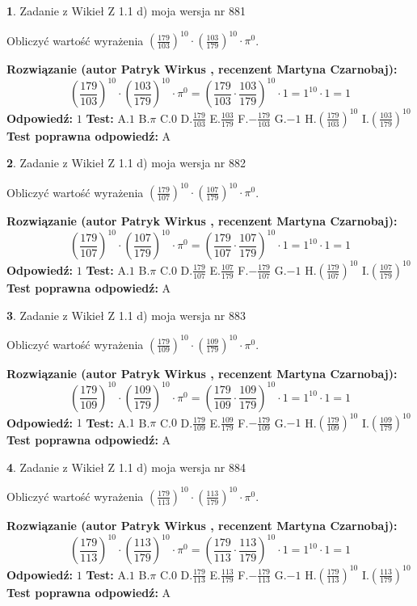 \documentclass[12pt, a4paper]{article}
\theoremstyle{definition} %
\newtheorem{zad}{}
\newcommand{\zadStart}[1]{\begin{zad}#1\newline}
\newcommand{\zadStop}{\end{zad}}
\newcommand{\rozwStart}[2]{\noindent \textbf{Rozwiązanie (autor #1 , recenzent #2): }\newline}
\newcommand{\rozwStop}{\newline}
\newcommand{\odpStart}{\noindent \textbf{Odpowiedź:}\newline}
\newcommand{\odpStop}{\newline}
\newcommand{\testStart}{\noindent \textbf{Test:}\newline}
\newcommand{\testStop}{\newline}
\newcommand{\kluczStart}{\noindent \textbf{Test poprawna odpowiedź:}\newline}
\newcommand{\kluczStop}{\newline}
\begin{document}
\zadStart{Zadanie z Wikieł Z 1.1 d) moja wersja nr 881}

Obliczyć wartość wyrażenia $(\frac{179}{103})^{10} \cdot (\frac{103}{179})^{10} \cdot \pi^{0}$.
\zadStop
\rozwStart{Patryk Wirkus}{Martyna Czarnobaj}
$$(\frac{179}{103})^{10} \cdot (\frac{103}{179})^{10} \cdot \pi^{0} = (\frac{179}{103} \cdot \frac{103}{179})^{10} \cdot 1 = 1^{10} \cdot 1 = 1$$
\rozwStop
\odpStart
$1$
\odpStop
\testStart
A.$1$ B.$\pi$ C.$0$ D.$\frac{179}{103}$ E.$\frac{103}{179}$
F.$-\frac{179}{103}$ G.$-1$
H.$(\frac{179}{103})^{10}$
I.$(\frac{103}{179})^{10}$
\testStop
\kluczStart
A
\kluczStop



\zadStart{Zadanie z Wikieł Z 1.1 d) moja wersja nr 882}

Obliczyć wartość wyrażenia $(\frac{179}{107})^{10} \cdot (\frac{107}{179})^{10} \cdot \pi^{0}$.
\zadStop
\rozwStart{Patryk Wirkus}{Martyna Czarnobaj}
$$(\frac{179}{107})^{10} \cdot (\frac{107}{179})^{10} \cdot \pi^{0} = (\frac{179}{107} \cdot \frac{107}{179})^{10} \cdot 1 = 1^{10} \cdot 1 = 1$$
\rozwStop
\odpStart
$1$
\odpStop
\testStart
A.$1$ B.$\pi$ C.$0$ D.$\frac{179}{107}$ E.$\frac{107}{179}$
F.$-\frac{179}{107}$ G.$-1$
H.$(\frac{179}{107})^{10}$
I.$(\frac{107}{179})^{10}$
\testStop
\kluczStart
A
\kluczStop



\zadStart{Zadanie z Wikieł Z 1.1 d) moja wersja nr 883}

Obliczyć wartość wyrażenia $(\frac{179}{109})^{10} \cdot (\frac{109}{179})^{10} \cdot \pi^{0}$.
\zadStop
\rozwStart{Patryk Wirkus}{Martyna Czarnobaj}
$$(\frac{179}{109})^{10} \cdot (\frac{109}{179})^{10} \cdot \pi^{0} = (\frac{179}{109} \cdot \frac{109}{179})^{10} \cdot 1 = 1^{10} \cdot 1 = 1$$
\rozwStop
\odpStart
$1$
\odpStop
\testStart
A.$1$ B.$\pi$ C.$0$ D.$\frac{179}{109}$ E.$\frac{109}{179}$
F.$-\frac{179}{109}$ G.$-1$
H.$(\frac{179}{109})^{10}$
I.$(\frac{109}{179})^{10}$
\testStop
\kluczStart
A
\kluczStop



\zadStart{Zadanie z Wikieł Z 1.1 d) moja wersja nr 884}

Obliczyć wartość wyrażenia $(\frac{179}{113})^{10} \cdot (\frac{113}{179})^{10} \cdot \pi^{0}$.
\zadStop
\rozwStart{Patryk Wirkus}{Martyna Czarnobaj}
$$(\frac{179}{113})^{10} \cdot (\frac{113}{179})^{10} \cdot \pi^{0} = (\frac{179}{113} \cdot \frac{113}{179})^{10} \cdot 1 = 1^{10} \cdot 1 = 1$$
\rozwStop
\odpStart
$1$
\odpStop
\testStart
A.$1$ B.$\pi$ C.$0$ D.$\frac{179}{113}$ E.$\frac{113}{179}$
F.$-\frac{179}{113}$ G.$-1$
H.$(\frac{179}{113})^{10}$
I.$(\frac{113}{179})^{10}$
\testStop
\kluczStart
A
\kluczStop
\end{document}
